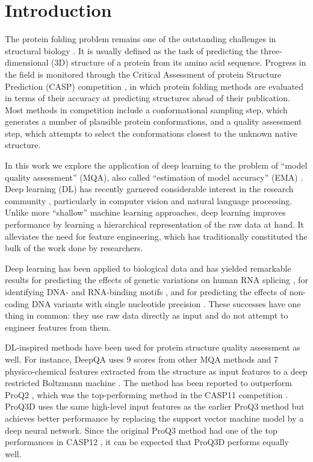 \documentclass{bioinfo}
\begin{document}
\maketitle

\section{Introduction}

The protein folding problem remains one of the outstanding challenges
in structural biology \citep{dill2012folding}.  It is usually defined
as the task of predicting the three-dimensional (3D) structure of a
protein from its amino acid sequence.
Progress in the field is monitored through the Critical Assessment of
protein Structure Prediction (CASP) competition \citep{moult1995large},
in which protein folding methods are evaluated in terms of their
accuracy at predicting structures ahead of their
publication. Most methods in competition include a conformational
sampling step, which generates a number of plausible protein
conformations, and a quality assessment step, which attempts to select
the conformations closest to the unknown native structure.

In this work we explore the application of deep learning to the
problem of ``model quality assessment'' (MQA), also called
``estimation of model accuracy'' (EMA) \citep{kryshtafovych2015}. Deep
learning (DL) has recently garnered considerable interest in the
research community \citep{lecun2015deep}, particularly in computer
vision and natural language processing. Unlike more ``shallow''
machine learning approaches, deep learning improves performance by
learning a hierarchical representation of the raw data at hand. It
alleviates the need for feature engineering, which has traditionally
constituted the bulk of the work done by researchers.

Deep learning has been applied to biological data and has
yielded remarkable results for predicting the effects of genetic
variations on human RNA splicing \citep{xiong2015human}, for
identifying DNA- and RNA-binding
motifs \citep{alipanahi2015predicting}, and for predicting the effects
of non-coding DNA variants with single nucleotide
precision \citep{zhou2015predicting}. These successes have one thing in
common: they use raw data directly as input and do not attempt to
engineer features from them.

DL-inspired methods have been used for protein structure quality
assessment as well. For instance, DeepQA \citep{cao2016deepqa} uses 9
scores from other MQA methods and 7 physico-chemical features
extracted from the structure as input features to a deep restricted
Boltzmann machine \citep{hinton2006fast}. The method has been reported
to outperform ProQ2 \citep{ray2012proq2}, which was the top-performing
method in the CASP11 competition \citep{kryshtafovych2015}.  ProQ3D
\citep{uziela2017proq3d} uses the same high-level input features as
the earlier ProQ3 method \citep{uziela2016proq3} but achieves better
performance by replacing the support vector machine model by a deep
neural network. Since the original ProQ3 method had one of the top
performances in CASP12 \citep{elofsson2017qacasp12}, it can be
expected that ProQ3D performs equally well.
\end{document}
